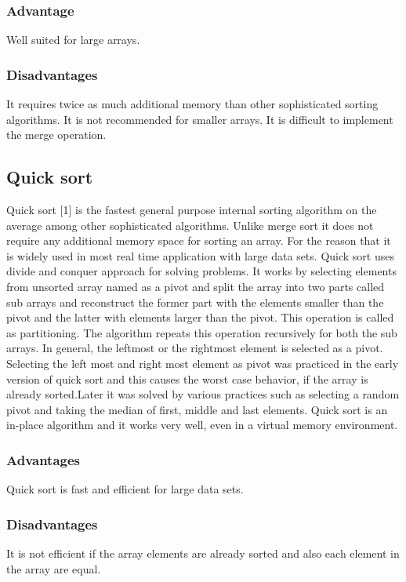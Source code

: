 \documentclass{article}
\begin{document}
\subsubsection{Advantage}
	Well suited for large arrays.

\subsubsection{Disadvantages}
	It requires twice as much additional memory than other sophisticated sorting algorithms.
	It is not recommended for smaller arrays. 
	It is difficult to implement the merge operation.

\subsection{Quick sort}
	Quick sort [1] is the fastest general purpose internal sorting algorithm on the average among other sophisticated algorithms. Unlike merge sort it does not require any additional memory space for sorting an array. For the reason that it is widely used in most real time application with large data sets. Quick sort uses divide and conquer approach for solving problems. It works by selecting elements from unsorted array named as a pivot and split the array into two parts called sub arrays and reconstruct the former part with the elements smaller than the pivot and the latter with elements larger than the pivot. This operation is called as partitioning. The algorithm repeats this operation recursively for both the sub arrays. In general, the leftmost or the rightmost element is selected as a pivot. Selecting the left most and right most element as pivot was practiced in the early version of quick sort and this causes the worst case behavior, if the array is already sorted.Later it was solved by various practices such as selecting a random pivot and taking the median of first, middle and last elements. Quick sort is an in-place algorithm and it works very well, even in a virtual memory environment.

\subsubsection{Advantages}
	Quick sort is fast and efficient for large data sets. 

\subsubsection{Disadvantages}
	It is not efficient if the array elements are already sorted and also each element in the array are equal.
	
\end{document}
